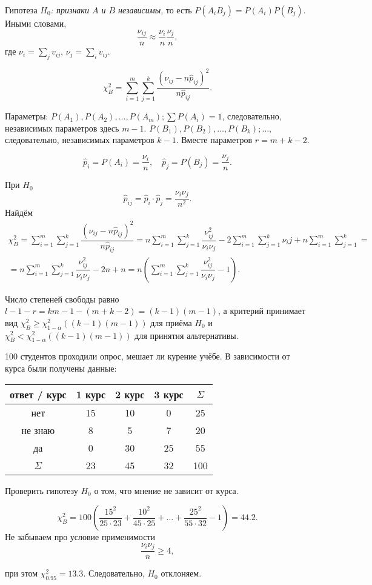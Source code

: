 Гипотеза \emph{$H_0$: признаки $A$ и $B$ независимы}, то есть
$P(A_i B_j) = P(A_i) P(B_j)$.
Иными словами,
\[
  \dfrac{\nu_{ij}}{n} \approx \dfrac{\nu_i}{n} \dfrac{\nu_j}{n},
\]
где $\nu_i = \sum_j v_{ij}$, $\nu_j = \sum_i v_{ij}$.

\[
  \chi^2_B = \sum_{i=1}^m \sum_{j=1}^k \dfrac{(\nu_{ij} - n \hat p_{ij})^2}{n
  \hat p_{ij}}.
\]

Параметры: $P(A_1), P(A_2), \dots, P(A_m); \sum P(A_i) = 1$, следовательно, независимых параметров здесь $m-1$. $P(B_1), P(B_2), \dots, P(B_k); \dots$, следовательно, независимых параметров $k-1$. Вместе параметров $r = m+k-2$.

\[
  \hat p_{i} = P(A_i) = \frac{\nu_i}{n}, \quad \hat p_j = P(B_j) = \frac{\nu_j}{n}.
\]

При $H_0$
\[
  \hat p_{ij} = \hat p_i \cdot \hat p_j = \dfrac{\nu_i \nu_j}{n^2}.
\]
Найдём
\begin{multline*}
  \chi^2_B
  = \sum_{i=1}^m \sum_{j=1}^k \dfrac{(\nu_{ij} - n \hat p_{ij})^2}{n \hat p_{ij}}
  = n \sum_{i=1}^m \sum_{j=1}^k \dfrac{\nu^2_{ij}}{\nu_i \nu_j} - 2 \sum_{i=1}^m \sum_{j=1}^k \nu_ij + n \sum_{i=1}^m \sum_{j=1}^k = \\
  = n \sum_{i=1}^m \sum_{j=1}^k \dfrac{\nu^2_{ij}}{\nu_i \nu_j} - 2n + n
  = n \left(\sum_{i=1}^m \sum_{j=1}^k \dfrac{\nu^2_{ij}}{\nu_i \nu_j} -
  1\right).
\end{multline*}

Число степеней свободы равно
$l-1-r = k m - 1 - (m+k-2) = (k-1)(m-1)$,
а критерий принимает вид $\chi^2_B \geqslant \chi^2_{1-\alpha} ( (k-1)(m-1) )$
для приёма $H_0$ и
$\chi^2_B < \chi^2_{1-\alpha} ( (k-1)(m-1) )$ для принятия альтернативы.

\begin{ex}
  100 студентов проходили опрос, мешает ли курение учёбе.
  В зависимости от курса были получены данные:

  \begin{center}
    \begin{tabular}{|c|c|c|c|c|}
      \hline
      ответ / курс & 1 курс & 2 курс & 3 курс & $ \Sigma $ \\
      \hline
      нет & 15 & 10 & 0 & 25\\
      \hline
      не знаю & 8 & 5 & 7 & 20 \\
      \hline
      да & 0 & 30 & 25 & 55 \\
      \hline
      $ \Sigma $  & 23 & 45 & 32 & 100 \\
      \hline
    \end{tabular}
  \end{center}

  Проверить гипотезу $H_0$ о том, что мнение не зависит от курса.
  \begin{solution}
  \[
  \chi^2_B = 100 \left(\dfrac{15^2}{25\cdot23} + \dfrac{10^2}{45\cdot25} + \dots
  + \dfrac{25^2}{55\cdot32} - 1\right) = 44.2.
  \]
  Не забываем про условие применимости
  \[
    \dfrac{\nu_i \nu_j}{n} \geqslant 4,
  \]

  при этом $\chi^2_{0.95} = 13.3$. Следовательно, $H_0$ отклоняем.
\end{solution}
\end{ex}


